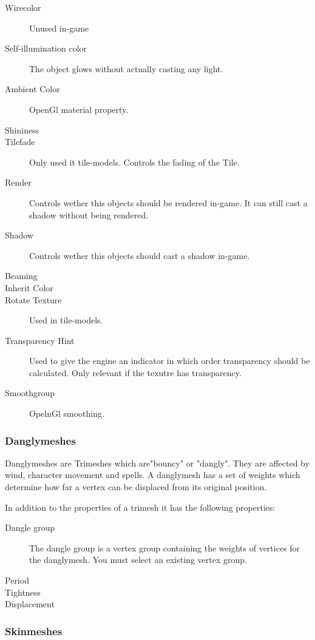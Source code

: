 \begin{description}
    \item[Wirecolor] Unused in-game
    \item[Self-illumination color] The object glows without actually casting any light.
    \item[Ambient Color] OpenGl material property.
    \item[Shininess]
    \item[Tilefade] Only used it tile-models. Controls the fading of the Tile.
    \item[Render] Controls wether this objects should be rendered in-game. It can still cast a shadow without being rendered.
    \item[Shadow] Controls wether this objects should cast a shadow in-game.
    \item[Beaming]
    \item[Inherit Color]
    \item[Rotate Texture] Used in tile-models.
    \item[Transparency Hint] Used to give the engine an indicator in which order transparency should be calculated. Only relevant if the texutre has transparency.
    \item[Smoothgroup] OpelnGl smoothing.
\end{description}

\subsubsection{Danglymeshes}
Danglymeshes are Trimeshes which are"bouncy" or "dangly". They are affected by
wind, character movement and spells. A danglymesh has a set of weights which
determine how far a vertex can be displaced from its original position.

In addition to the properties of a trimesh it has the following properties:
\begin{description}
    \item[Dangle group] The dangle group is a vertex group containing the weights of vertices for the danglymesh. You must select an existing vertex group.
    \item[Period]
    \item[Tightness]
    \item[Displacement]
\end{description}

\subsubsection{Skinmeshes}

